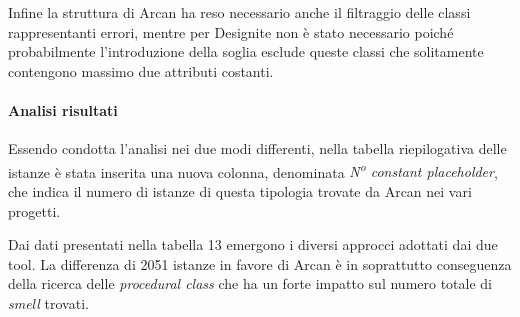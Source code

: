          Infine la struttura di Arcan ha reso necessario anche il filtraggio delle classi rappresentanti errori, mentre per Designite non è stato necessario poiché probabilmente l'introduzione della soglia esclude queste classi che solitamente contengono massimo due attributi costanti.
    
    \paragraph{Analisi risultati}
        Essendo condotta l'analisi nei due modi differenti, nella tabella riepilogativa delle istanze è stata inserita una nuova colonna, denominata \textit{N\textsuperscript{o} constant placeholder}, che indica il numero di istanze di questa tipologia trovate da Arcan nei vari progetti.
        
        Dai dati presentati nella tabella 13 emergono i diversi approcci adottati dai due tool. La differenza di 2051 istanze in favore di Arcan è in soprattutto conseguenza della ricerca delle \textit{procedural class} che ha un forte impatto sul numero totale di \textit{smell} trovati. \\
        
